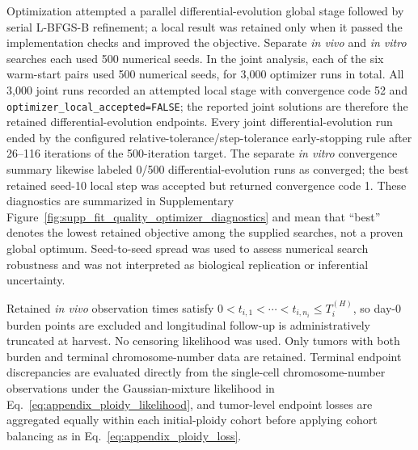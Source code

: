 \documentclass[11pt]{article}
\begin{document}
Optimization attempted a parallel differential-evolution global stage followed by serial L-BFGS-B refinement; a local result was retained only when it passed the implementation checks and improved the objective. Separate \textit{in vivo} and \textit{in vitro} searches each used 500 numerical seeds. In the joint analysis, each of the six warm-start pairs used 500 numerical seeds, for 3,000 optimizer runs in total. All 3,000 joint runs recorded an attempted local stage with convergence code 52 and \texttt{optimizer\_local\_accepted=FALSE}; the reported joint solutions are therefore the retained differential-evolution endpoints. Every joint differential-evolution run ended by the configured relative-tolerance/step-tolerance early-stopping rule after 26--116 iterations of the 500-iteration target. The separate \textit{in vitro} convergence summary likewise labeled 0/500 differential-evolution runs as converged; the best retained seed-10 local step was accepted but returned convergence code 1. These diagnostics are summarized in Supplementary Figure~\ref{fig:supp_fit_quality_optimizer_diagnostics} and mean that ``best'' denotes the lowest retained objective among the supplied searches, not a proven global optimum. Seed-to-seed spread was used to assess numerical search robustness and was not interpreted as biological replication or inferential uncertainty.

Retained \textit{in vivo} observation times satisfy $0<t_{i,1}<\cdots<t_{i,n_i}\le T_i^{(H)}$, so day-0 burden points are excluded and longitudinal follow-up is administratively truncated at harvest. No censoring likelihood was used. Only tumors with both burden and terminal chromosome-number data are retained. Terminal endpoint discrepancies are evaluated directly from the single-cell chromosome-number observations under the Gaussian-mixture likelihood in Eq.~\eqref{eq:appendix_ploidy_likelihood}, and tumor-level endpoint losses are aggregated equally within each initial-ploidy cohort before applying cohort balancing as in Eq.~\eqref{eq:appendix_ploidy_loss}.
\end{document}
